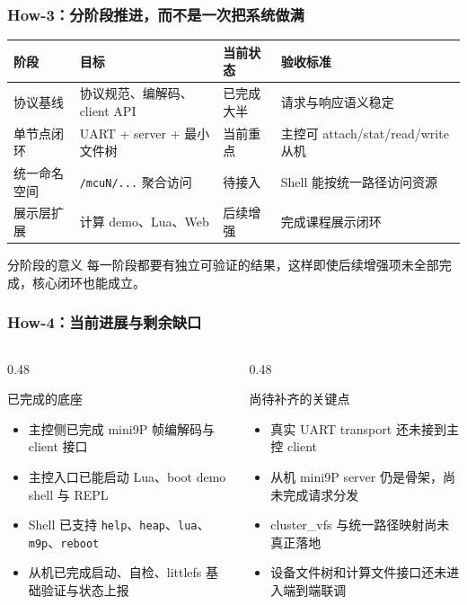 \documentclass[aspectratio=169]{ctexbeamer}
\begin{document}
\begin{frame}
  \frametitle{How-3：分阶段推进，而不是一次把系统做满}
  \small
  \begin{tabular}{p{}p{}p{}p{}}
    \hline
    阶段 & 目标 & 当前状态 & 验收标准 \\
    \hline
    协议基线 & 协议规范、编解码、client API & 已完成大半 & 请求与响应语义稳定 \\
    单节点闭环 & UART + server + 最小文件树 & 当前重点 & 主控可 attach/stat/read/write 从机 \\
    统一命名空间 & \texttt{/mcuN/...} 聚合访问 & 待接入 & Shell 能按统一路径访问资源 \\
    展示层扩展 & 计算 demo、Lua、Web & 后续增强 & 完成课程展示闭环 \\
    \hline
  \end{tabular}
  \vspace{0.25cm}
  \begin{alertblock}{分阶段的意义}
    \small
    每一阶段都要有独立可验证的结果，这样即使后续增强项未全部完成，核心闭环也能成立。
  \end{alertblock}
\end{frame}

\begin{frame}
  \frametitle{How-4：当前进展与剩余缺口}
  \begin{columns}[T]
    \begin{column}{0.48\textwidth}
      \begin{block}{已完成的底座}
        \small
        \begin{itemize}
          \item 主控侧已完成 mini9P 帧编解码与 client 接口
          \item 主控入口已能启动 Lua、boot demo shell 与 REPL
          \item Shell 已支持 \texttt{help}、\texttt{heap}、\texttt{lua}、\texttt{m9p}、\texttt{reboot}
          \item 从机已完成启动、自检、littlefs 基础验证与状态上报
        \end{itemize}
      \end{block}
    \end{column}
    \begin{column}{0.48\textwidth}
      \begin{block}{尚待补齐的关键点}
        \small
        \begin{itemize}
          \item 真实 UART transport 还未接到主控 client
          \item 从机 mini9P server 仍是骨架，尚未完成请求分发
          \item cluster\_vfs 与统一路径映射尚未真正落地
          \item 设备文件树和计算文件接口还未进入端到端联调
        \end{itemize}
      \end{block}
    \end{column}
  \end{columns}
\end{frame}
\end{document}
